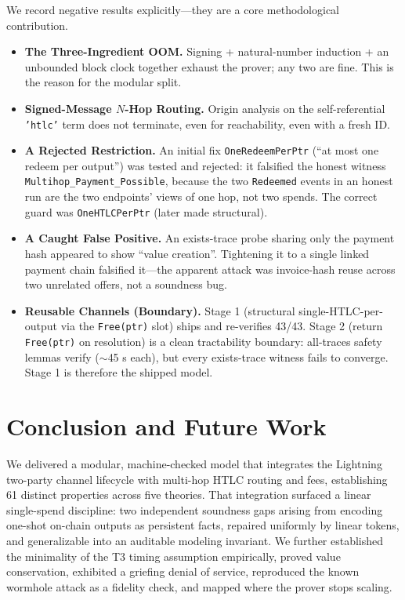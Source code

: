 \documentclass[sigconf,review]{acmart}
\theoremstyle{acmdefinition}
\begin{document}
We record negative results explicitly---they are a core methodological contribution.
\begin{itemize}
    \item \textbf{The Three-Ingredient OOM.} Signing + natural-number induction + an unbounded block clock together exhaust the prover; any two are fine. This is the reason for the modular split.
    \item \textbf{Signed-Message $N$-Hop Routing.} Origin analysis on the self-referential \texttt{'htlc'} term does not terminate, even for reachability, even with a fresh ID.
    \item \textbf{A Rejected Restriction.} An initial fix \texttt{OneRedeemPerPtr} (``at most one redeem per output'') was tested and rejected: it falsified the honest witness \texttt{Multihop\_Payment\_Possible}, because the two \texttt{Redeemed} events in an honest run are the two endpoints' views of one hop, not two spends. The correct guard was \texttt{OneHTLCPerPtr} (later made structural).
    \item \textbf{A Caught False Positive.} An exists-trace probe sharing only the payment hash appeared to show ``value creation''. Tightening it to a single linked payment chain falsified it---the apparent attack was invoice-hash reuse across two unrelated offers, not a soundness bug.
    \item \textbf{Reusable Channels (Boundary).} Stage 1 (structural single-HTLC-per-output via the \texttt{Free(ptr)} slot) ships and re-verifies 43/43. Stage 2 (return \texttt{Free(ptr)} on resolution) is a clean tractability boundary: all-traces safety lemmas verify ($\sim$45 s each), but every exists-trace witness fails to converge. Stage 1 is therefore the shipped model.
\end{itemize}

\section{Conclusion and Future Work}

We delivered a modular, machine-checked model that integrates the Lightning two-party channel lifecycle with multi-hop HTLC routing and fees, establishing 61 distinct properties across five theories. That integration surfaced a linear single-spend discipline: two independent soundness gaps arising from encoding one-shot on-chain outputs as persistent facts, repaired uniformly by linear tokens, and generalizable into an auditable modeling invariant. We further established the minimality of the T3 timing assumption empirically, proved value conservation, exhibited a griefing denial of service, reproduced the known wormhole attack as a fidelity check, and mapped where the prover stops scaling.
\end{document}
